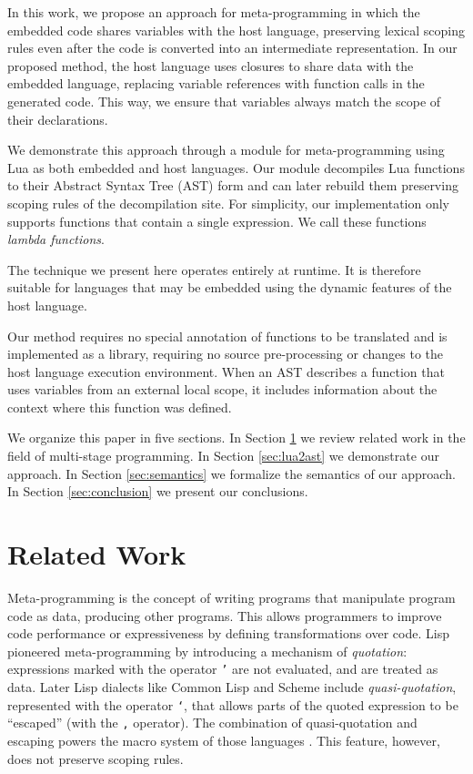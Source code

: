 \documentclass[english]{llncs}
\begin{document}
In this work, we propose an approach for meta-programming
in which the embedded code shares variables with the
host language, preserving lexical scoping rules even after the code is
converted into an intermediate representation.
In our proposed method, the host language uses closures
to share data with the embedded language, replacing variable references
with function calls in the generated code.
This way, we ensure that variables always match the scope of their declarations.

We demonstrate this approach through a module for meta-programming using Lua
as both embedded and host languages.
Our module decompiles Lua functions to their Abstract Syntax Tree (AST) form
and can later rebuild them preserving scoping rules of the decompilation site.
For simplicity, our implementation only supports functions that contain
a single expression.
We call these functions \emph{lambda functions}.

The technique we present here operates entirely at runtime.
It is therefore suitable for languages that may be embedded using
the dynamic features of the host language.

Our method requires no special annotation of functions to be translated and is
implemented as a library, requiring no source pre-processing or changes to
the host language execution environment.
When an AST describes a function that uses variables from an
external local scope, it includes information about the context
where this function was defined.

We organize this paper in five sections.
In Section \ref{sec:related} we review related work in the field
of multi-stage programming.
In Section \ref{sec:lua2ast} we demonstrate our approach.
In Section \ref{sec:semantics} we formalize the semantics of our approach.
In Section \ref{sec:conclusion} we present our conclusions.

\section{Related Work}
\label{sec:related}

Meta-programming is the concept of writing programs that manipulate
program code as data, producing other programs. This allows programmers
to improve code performance or expressiveness by defining transformations over code.
Lisp \cite{McCarthy1960RFS} pioneered meta-programming by introducing
a mechanism of \emph{quotation}: expressions marked with the operator \texttt{'}
are not evaluated, and are treated as data.
Later Lisp dialects like Common Lisp and Scheme include \emph{quasi-quotation},
represented with the operator \texttt{`}, that allows parts of the quoted expression
to be ``escaped'' (with the  \texttt{,} operator). The combination of
quasi-quotation and escaping powers the macro system of those languages \cite{Bawden1999quasiquotation}.
This feature, however, does not preserve scoping rules.
\end{document}
